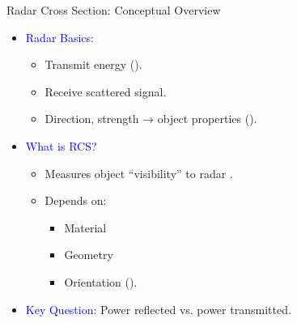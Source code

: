 \begin{frame}{Radar Cross Section: Conceptual Overview}
    \small
    \begin{itemize}
        \item \textcolor{blue}{Radar Basics:}
            \begin{itemize}
                \item Transmit energy (\cite[p. 21]{skolnik1962introduction}).
                \item Receive scattered signal.
                \item Direction, strength → object properties (\cite[p. 45]{knott2004radar}).
            \end{itemize}
        \item \textcolor{blue}{What is RCS?}
            \begin{itemize}
                \item Measures object ``visibility'' to radar \cite[Section 2]{cite-trcs}.
                \item Depends on:  
                    \begin{itemize}
                        \item Material  
                        \item Geometry  
                        \item Orientation (\cite[pp. 3-4]{peebles2007radar}).
                    \end{itemize}
            \end{itemize}
        \item \textcolor{blue}{Key Question:}
            Power reflected vs. power transmitted.
    \end{itemize}
\end{frame}

